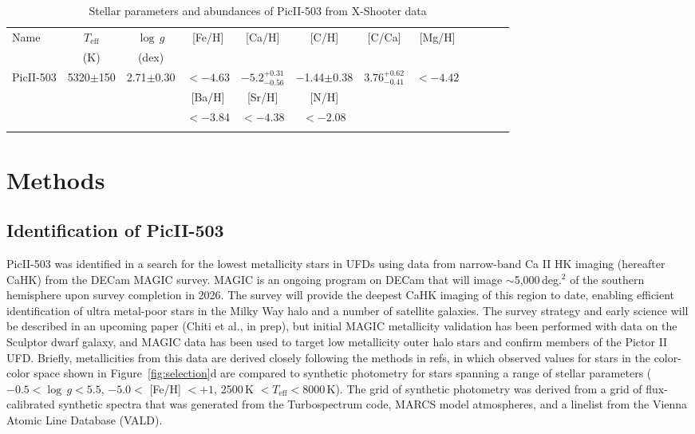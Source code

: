 \documentclass[pdflatex,sn-nature]{sn-jnl}%
\theoremstyle{thmstyleone}%
\theoremstyle{thmstyletwo}%
\theoremstyle{thmstylethree}%
\begin{document}
\begin{table}[h]
\caption{\label{tab:abundances}Stellar parameters and abundances of PicII-503 from X-Shooter data}\label{fig:pic2pr503}
\begin{tabular*}{\textwidth}{@{\extracolsep\fill}lccccccccccc}
\toprule%
Name &  $T_{\text{eff}}$ & $\log\,g$ & [Fe/H] & [Ca/H] & [C/H] & [C/Ca] & [Mg/H]\\
 &  (K) & (dex) &  &  &  &  & \\
\midrule
PicII-503  & 5320$\pm$150 & 2.71$\pm$0.30 & $<-4.63$ & $-5.2^{+0.31}_{-0.56}$ & $-$1.44$\pm$0.38 & $3.76^{+0.62}_{-0.41}$ & $<-4.42$\\
\midrule
 &   &  & [Ba/H] & [Sr/H] & [N/H] &  & \\
\midrule
  & &  &  $< -3.84$ & $< -4.38$ & $<-2.08$  &  & \\
\botrule
\end{tabular*}
\end{table}

\clearpage

\section*{Methods}

\subsection*{Identification of PicII-503}

PicII-503 was identified in a search for the lowest metallicity stars in UFDs using data from narrow-band Ca II HK imaging (hereafter CaHK) from the DECam MAGIC survey.
MAGIC is an ongoing program on DECam that will image $\sim$5,000\,deg.$^2$ of the southern hemisphere upon survey completion in 2026.
The survey will provide the deepest CaHK imaging of this region to date, enabling efficient identification of ultra metal-poor stars in the Milky Way halo and a number of satellite galaxies.
The survey strategy and early science will be described in an upcoming paper (Chiti et al., in prep), but initial MAGIC metallicity validation has been performed with data on the Sculptor dwarf galaxy\cite{bcl+25}, and MAGIC data has been used to target low metallicity outer halo stars\cite{plc+25} and confirm members of the Pictor II UFD\cite{pace+25}.
Briefly, metallicities from this data are derived closely following the methods in refs\cite{cfj+20, cfm+21}, in which observed values for stars in the color-color space shown in Figure~\ref{fig:selection}d are compared to synthetic photometry for stars spanning a range of stellar parameters ($-0.5 < \log\,g < 5.5$, $-5.0 <$ [Fe/H] $ < +1$, 2500\,K $< T_{\text{eff}} < $8000\,K). 
The grid of synthetic photometry was derived from a grid of flux-calibrated synthetic spectra that was generated from the Turbospectrum code\cite{ap+98,p+12}, MARCS model atmospheres\cite{gee+08}, and a linelist from the Vienna Atomic Line Database (VALD)\cite{pkr+95, rpk+15}.
\end{document}

